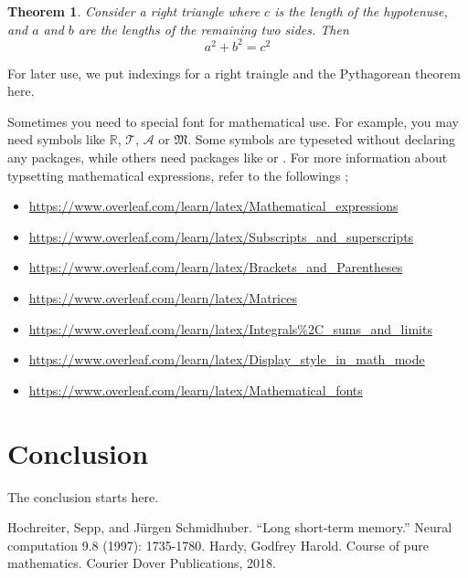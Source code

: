 \documentclass[11pt]{report}
\newtheorem{theorem}{Theorem} %
\begin{document}
\begin{theorem}
Consider a right triangle where \(c\) is the length of the hypotenuse, and \(a\) and \(b\) are the lengths of the remaining two sides.
Then
\begin{equation}
a^2+b^2=c^2
\end{equation}
\end{theorem}
For later use, we put indexings for a right traingle and the Pythagorean theorem here.

Sometimes you need to special font for mathematical use.
For example, you may need symbols like \(\mathbb R\), \(\mathcal T\), \(\mathscr A\) or \(\mathfrak M\).
Some symbols are typeseted without declaring any packages, while others need packages like  or .
For more information about typsetting mathematical expressions, refer to the followings ;
\begin{itemize}
\item
\url{https://www.overleaf.com/learn/latex/Mathematical_expressions}
\item
\url{https://www.overleaf.com/learn/latex/Subscripts_and_superscripts}
\item
\url{https://www.overleaf.com/learn/latex/Brackets_and_Parentheses}
\item
\url{https://www.overleaf.com/learn/latex/Matrices}
\item
\url{https://www.overleaf.com/learn/latex/Integrals\%2C_sums_and_limits}
\item
\url{https://www.overleaf.com/learn/latex/Display_style_in_math_mode}
\item
\url{https://www.overleaf.com/learn/latex/Mathematical_fonts}
\end{itemize}

\chapter{Conclusion}\label{chap:conclusion}
The conclusion starts here.

\newpage
\renewcommand\bibname{Reference}
\begin{thebibliography}{AA}
 Hochreiter, Sepp, and Jürgen Schmidhuber. ``Long short-term memory.'' Neural computation 9.8 (1997): 1735-1780.
 Hardy, Godfrey Harold. Course of pure mathematics. Courier Dover Publications, 2018.
\end{thebibliography}
\end{document}
